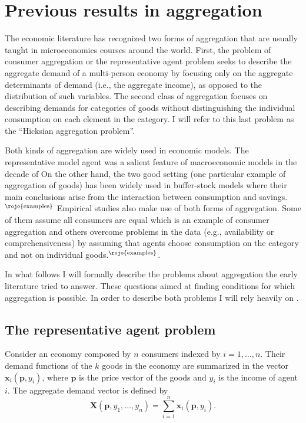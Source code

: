\documentclass[english, a4paper,12pt]{article}
\begin{document}
\section{Previous results in aggregation} \label{sec:prevresults}
The economic literature has recognized two forms of aggregation that are usually taught in microeconomics courses around the world. First, the problem of consumer aggregation or the representative agent problem seeks to describe the aggregate demand of a multi-person economy by focusing only on the aggregate determinants of demand (i.e., the aggregate income), as opposed to the distribution of such variables. The second class of aggregation focuses on describing demands for categories of goods without distinguishing the individual consumption on each element in the category. I will refer to this last problem as the ``Hicksian aggregation problem''.

Both kinds of aggregation are widely used in economic models. The representative model agent was a salient feature of macroeconomic models in the decade of  On the other hand, the two good setting (one particular example of aggregation of goods) has been widely used in buffer-stock models where their main conclusions arise from the interaction between consumption and savings.$^{\text{\rojo{examples}}}$ Empirical studies also make use of both forms of aggregation. Some of them assume all consumers are equal which is an example of consumer aggregation and others overcome problems in the data (e.g., availability or comprehensiveness) by assuming that agents choose consumption on the category and not on individual goods.$^{\text{\rojo{examples}}}$.

In what follows I will formally describe the problems about aggregation the early literature tried to answer. These questions aimed at finding conditions for which aggregation is possible. In order to describe both problems I will rely heavily on \cite{VarianBook}.

\subsection{The representative agent problem} \label{ssec:repagent}
Consider an economy composed by $n$ consumers indexed by $i = 1, \ldots, n$. Their demand functions of the $k$ goods in the economy are summarized in the vector $\mathbf{x}_{i}(\mathbf{p}, y_{i})$, where $\mathbf{p}$ is the price vector of the goods and $y_{i}$ is the income of agent $i$. The aggregate demand vector is defined by
	\begin{equation} \label{eq:aggdemand1}
		\mathbf{X}(\mathbf{p}, y_{1}, \ldots, y_{n}) = \sum_{i=1}^{n} \mathbf{x}_{i}(\mathbf{p},y_{i}).
	\end{equation}
\end{document}
